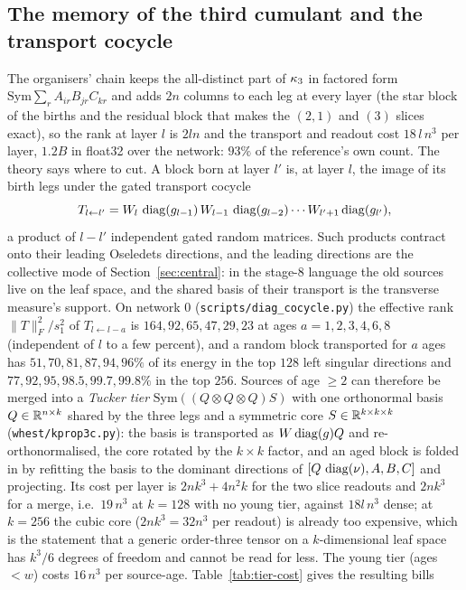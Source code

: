\subsection{The memory of the third cumulant and the transport cocycle}
The organisers' chain keeps the all-distinct part of $\kappa_3$ in factored form $\mathrm{Sym}\sum_rA_{ir}B_{jr}C_{kr}$ and adds
$2n$ columns to each leg at every layer (the star block of the births and the residual block that makes the
$(2,1)$ and $(3)$ slices exact), so the rank at layer $l$ is $2ln$ and the transport and readout cost $18\,l\,n^3$ per
layer, $1.2B$ in float32 over the network: $93\%$ of the reference's own count. The theory says where to cut. A
block born at layer $l'$ is, at layer $l$, the image of its birth legs under the gated transport cocycle
\[
T_{l\leftarrow l'}=W_l\,\operatorname{diag}(g_{l-1})\,W_{l-1}\,\operatorname{diag}(g_{l-2})\cdots W_{l'+1}\operatorname{diag}(g_{l'}),
\]
a product of $l-l'$ independent gated random matrices. Such products contract onto their leading Oseledets
directions, and the leading directions are the collective mode of Section~\ref{sec:central}: in the stage-8 language
the old sources live on the leaf space, and the shared basis of their transport is the transverse measure's
support. On network $0$ (\texttt{scripts/diag\_cocycle.py}) the effective rank $\|T\|_F^2/s_1^2$ of $T_{l\leftarrow l-a}$
is $164,92,65,47,29,23$ at ages $a=1,2,3,4,6,8$ (independent of $l$ to a few percent), and a random block
transported for $a$ ages has $51,70,81,87,94,96\%$ of its energy in the top $128$ left singular directions and
$77,92,95,98.5,99.7,99.8\%$ in the top $256$. Sources of age $\ge2$ can therefore be merged into a \emph{Tucker tier}
$\mathrm{Sym}((Q\otimes Q\otimes Q)S)$ with one orthonormal basis $Q\in\mathbb R^{n\times k}$ shared by the three legs and a
symmetric core $S\in\mathbb R^{k\times k\times k}$ (\texttt{whest/kprop3c.py}): the basis is transported as $W\operatorname{diag}(g)Q$ and
re-orthonormalised, the core rotated by the $k\times k$ factor, and an aged block is folded in by refitting the basis
to the dominant directions of $[Q\,\operatorname{diag}(\nu),A,B,C]$ and projecting. Its cost per layer is $2nk^3+4n^2k$ for the two
slice readouts and $2nk^3$ for a merge, i.e.\ $19\,n^3$ at $k=128$ with no young tier, against $18l\,n^3$ dense;
at $k=256$ the cubic core ($2nk^3=32n^3$ per readout) is already too expensive, which is the statement that a
generic order-three tensor on a $k$-dimensional leaf space has $k^3/6$ degrees of freedom and cannot be read for
less. The young tier (ages $<w$) costs $16\,n^3$ per source-age. Table~\ref{tab:tier-cost} gives the resulting bills
